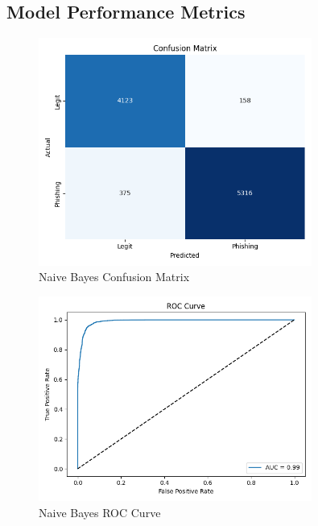 \documentclass[a4paper,10pt]{article}
\begin{document}
\pagebreak
\subsection{Model Performance Metrics}

\begin{figure}[ht!]
	\centering
	\includegraphics[width=0.8\textwidth]{model_performance/NaiveBayes/confusion_matrix.png}
	\caption{Naive Bayes Confusion Matrix}
	\label{fig:confusion-matrix}
\end{figure}

\begin{figure}[ht!]
	\centering
	\includegraphics[width=0.8\textwidth]{model_performance/NaiveBayes/roc_curve.png}
	\caption{Naive Bayes ROC Curve}
	\label{fig:roc-curve}
\end{figure}
\end{document}
